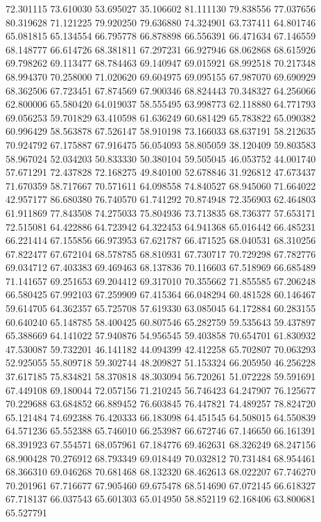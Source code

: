 72.301115
73.610030
53.695027
35.106602
81.111130
79.838556
77.037656
80.319628
71.121225
79.920250
79.636880
74.324901
63.737411
64.801746
65.081815
65.134554
66.795778
66.878898
66.556391
66.471634
67.146559
68.148777
66.614726
68.381811
67.297231
66.927946
68.062868
68.615926
69.798262
69.113477
68.784463
69.140947
69.015921
68.992518
70.217348
68.994370
70.258000
71.020620
69.604975
69.095155
67.987070
69.690929
68.362506
67.723451
67.874569
67.900346
68.824443
70.348327
64.256066
62.800006
65.580420
64.019037
58.555495
63.998773
62.118880
64.771793
69.056253
59.701829
63.410598
61.636249
60.681429
65.783822
65.090382
60.996429
58.563878
67.526147
58.910198
73.166033
68.637191
58.212635
70.924792
67.175887
67.916475
56.054093
58.805059
38.120409
59.803583
58.967024
52.034203
50.833330
50.380104
59.505045
46.053752
44.001740
57.671291
72.437828
72.168275
49.840100
52.678846
31.926812
47.673437
71.670359
58.717667
70.571611
64.098558
74.840527
68.945060
71.664022
42.957177
86.680380
76.740570
61.741292
70.874948
72.356903
62.464803
61.911869
77.843508
74.275033
75.804936
73.713835
68.736377
57.653171
72.515081
64.422886
64.723942
64.322453
64.941368
65.016442
66.485231
66.221414
67.155856
66.973953
67.621787
66.471525
68.040531
68.310256
67.822477
67.672104
68.578785
68.810931
67.730717
70.729298
67.782776
69.034712
67.403383
69.469463
68.137836
70.116603
67.518969
66.685489
71.141657
69.251653
69.204412
69.317010
70.355662
71.855585
67.206248
66.580425
67.992103
67.259909
67.415364
66.048294
60.481528
60.146467
59.614705
64.362357
65.725708
57.619330
63.085045
64.172884
60.283155
60.640240
65.148785
58.400425
60.807546
65.282759
59.535643
59.437897
65.388669
64.141022
57.940876
54.956545
59.403858
70.654701
61.830932
47.530087
59.732201
46.141182
44.094399
42.412258
65.702807
70.063293
52.925055
55.809718
59.302744
48.209827
51.153324
66.205950
46.256228
37.617185
75.834821
58.370818
48.303094
56.720261
51.072228
59.591691
67.449108
69.180044
72.057156
71.210245
56.746423
64.247907
76.125677
70.229688
63.684852
66.889452
76.603845
76.447821
74.489257
78.824720
65.121484
74.692388
76.420333
66.183098
64.451545
64.508015
64.550839
64.571236
65.552388
65.746010
66.253987
66.672746
67.146650
66.161391
68.391923
67.554571
68.057961
67.184776
69.462631
68.326249
68.247156
68.900428
70.276912
68.793349
69.018449
70.032812
70.731484
68.954461
68.366310
69.046268
70.681468
68.132320
68.462613
68.022207
67.746270
70.201961
67.716677
67.905460
69.675478
68.514690
67.072145
66.618327
67.718137
66.037543
65.601303
65.014950
58.852119
62.168406
63.800681
65.527791
